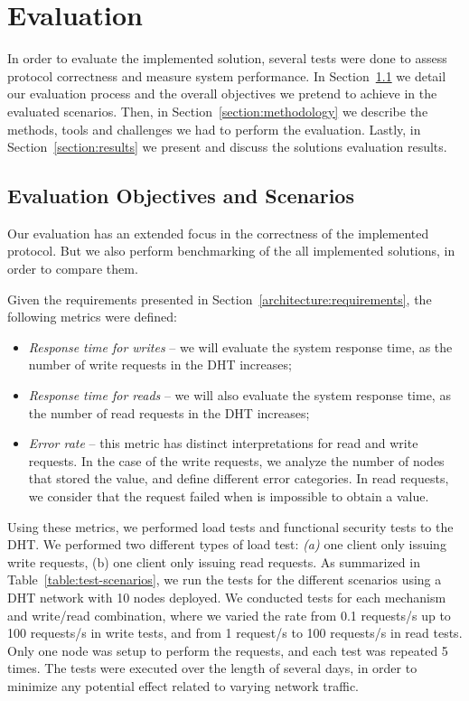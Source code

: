 \chapter{Evaluation}
\label{chapter:evaluation}

In order to evaluate the implemented solution, several tests were done to assess protocol correctness and measure system performance.
In Section~\ref{section:scenarios} we detail our evaluation process and the overall objectives we pretend to achieve in the evaluated scenarios.
Then, in Section~\ref{section:methodology} we describe the methods, tools and challenges we had to perform the evaluation.
Lastly, in Section~\ref{section:results} we present and discuss the solutions evaluation results.

\section{Evaluation Objectives and Scenarios}
\label{section:scenarios}

Our evaluation has an extended focus in the correctness of the implemented protocol.
But we also perform benchmarking of the all implemented solutions, in order to compare them.

Given the requirements presented in Section~\ref{architecture:requirements}, the following metrics were defined:

\begin{itemize}
  \item \textit{Response time for writes} – we will evaluate the system response time, as the number of write requests in the DHT increases;
  \item \textit{Response time for reads} – we will also evaluate the system response time, as the number of read requests in the DHT increases;
  \item \textit{Error rate} – this metric has distinct interpretations for read and write requests. In the case of the write requests, we analyze the number of nodes that stored the value, and define different error categories. In read requests, we consider that the request failed when is impossible to obtain a value.
\end{itemize}

Using these metrics, we performed load tests and functional security tests to the \ac{DHT}.
We performed two different types of load test: \textit{(a)} one client only issuing write requests, (b) one client only issuing read requests.
As summarized in Table~\ref{table:test-scenarios}, we run the tests for the different scenarios using a DHT network with 10 nodes deployed.
We conducted tests for each mechanism and write/read combination, where we varied the rate from 0.1 requests/s up to 100 requests/s in write tests, and from 1 request/s to 100 requests/s in read tests.
Only one node was setup to perform the requests, and each test was repeated 5 times.
The tests were executed over the length of several days, in order to minimize any potential effect related to varying network traffic.

